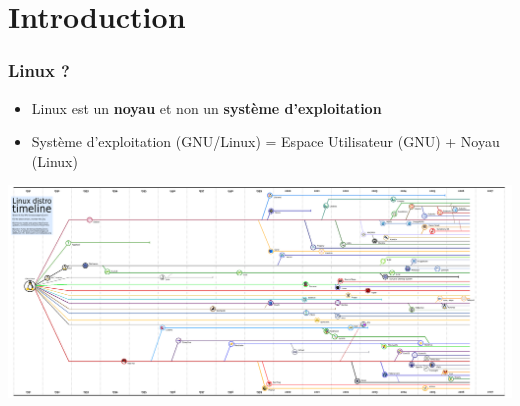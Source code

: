 \section*{Introduction}

\begin{frame}
    \frametitle{Linux ?}
        \begin{itemize}
            \item Linux est un \textbf{noyau} et non un \textbf{système d'exploitation}
            \item Système d'exploitation (GNU/Linux) = Espace Utilisateur (GNU) + Noyau (Linux)
        \end{itemize}
\end{frame}

\begin{frame}
        \begin{center}
            \includegraphics[width=\linewidth, height=\textheight, keepaspectratio]{linux_timeline.png}
        \end{center}
\end{frame}
